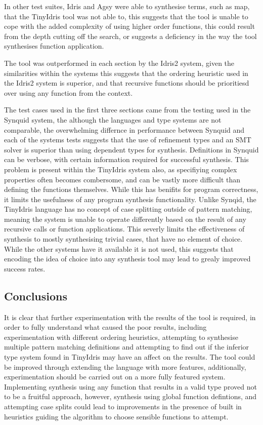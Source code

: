 \documentclass[a4paper]{article}
\begin{document}
In other test suites, Idris and Agsy were able to synthesise terms,
such as map, that the TinyIdris tool was not able to, this suggests
that the tool is unable to cope with the added complexity of using
higher order functions, this could result from the depth cutting off
the search, or suggests a deficiency in the way the tool synthesises
function application.

The tool was outperformed in each section by the Idris2 system,
given the similarities within the systems this suggests that the
ordering heuristic used in the Idris2 system is superior, and that
recursive functions should be prioritiesd over using any function
from the context.

The test cases used in the first three sections came from the testing
used in the Synquid system, the although the languages and type systems
are not comparable, the overwhelming differnce in performance between
Synquid and each of the systems tests suggests that the use of
refinement types and an SMT solver is superior than using dependent
types for synthesis. Definitions in Synquid can be verbose, with
certain information required for successful synthesis. This problem is
present within the TinyIdris system also, as specifiying complex
properties often becomes combersome, and can be vastly more difficult
than defining the functions themselves. While this has benifits for
program correctness, it limits the usefulness of any program synthesis
functionality. Unlike Synqid, the TinyIdris language has no concept of
case splitting outside of pattern matching,
meaning the system is unable to operate differently based on the result
of any recursive calls or function applications. This severly limits
the effectiveness of synthesis to mostly synthesising trivial cases,
that have no element of choice. While the other systems have it
available it is not used, this suggests that encoding the idea of
choice into any synthesis tool may lead to grealy improved success
rates.


\subsection{Conclusions}
It is clear that further experimentation with the results of the
tool is required, in order to fully understand what caused the poor
results, including experimentation with different ordering heuristics,
attempting to synthesise multiple pattern matching definitions and
attempting to find out if the inferior type system found in TinyIdris
may have an affect on the results. The tool could be improved through
extending the language with more features, additionally,
experimentation should be carried out on a more fully featured system.
Implementing synthesis using any function that results in a valid type
proved not to be a fruitful approach, however, synthesis using
global function defintions, and attempting case splits could lead to
improvements in the presence of built in heuristics guiding the
algorithm to choose sensible functions to attempt.
  
\clearpage
\end{document}
